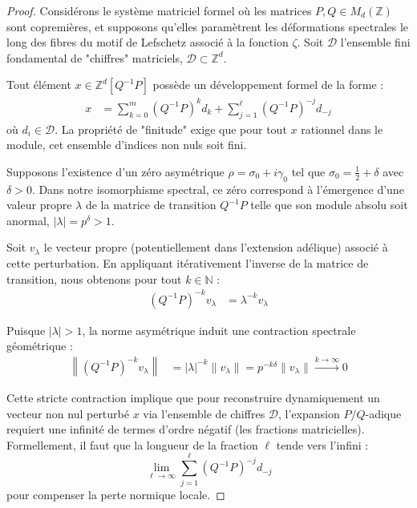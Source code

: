 \documentclass[
]{article}
\begin{document}
\begin{proof}
Considérons le système matriciel formel où les matrices $P, Q \in M_d(\mathbb{Z})$ sont copremières, et supposons qu'elles paramètrent les déformations spectrales le long des fibres du motif de Lefschetz associé à la fonction $\zeta$. Soit $\mathcal{D}$ l'ensemble fini fondamental de "chiffres" matriciels, $\mathcal{D} \subset \mathbb{Z}^d$.

Tout élément $x \in \mathbb{Z}^d[Q^{-1}P]$ possède un développement formel de la forme :
\begin{align*}
x &= \sum_{k=0}^{m} (Q^{-1}P)^k d_k + \sum_{j=1}^{\ell} (Q^{-1}P)^{-j} d_{-j}
\end{align*}
où $d_i \in \mathcal{D}$. La propriété de "finitude" exige que pour tout $x$ rationnel dans le module, cet ensemble d'indices non nuls soit fini.

Supposons l'existence d'un zéro asymétrique $\rho = \sigma_0 + i\gamma_0$ tel que $\sigma_0 = \frac{1}{2} + \delta$ avec $\delta > 0$. Dans notre isomorphisme spectral, ce zéro correspond à l'émergence d'une valeur propre $\lambda$ de la matrice de transition $Q^{-1}P$ telle que son module absolu soit anormal, $|\lambda| = p^{\delta} > 1$.

Soit $v_{\lambda}$ le vecteur propre (potentiellement dans l'extension adélique) associé à cette perturbation. En appliquant itérativement l'inverse de la matrice de transition, nous obtenons pour tout $k \in \mathbb{N}$ :
\begin{align*}
(Q^{-1}P)^{-k} v_{\lambda} &= \lambda^{-k} v_{\lambda}
\end{align*}

Puisque $|\lambda| > 1$, la norme asymétrique induit une contraction spectrale géométrique :
\begin{align*}
\left\| (Q^{-1}P)^{-k} v_{\lambda} \right\| &= |\lambda|^{-k} \|v_{\lambda}\| = p^{-k\delta} \|v_{\lambda}\| \xrightarrow{k \to \infty} 0
\end{align*}

Cette stricte contraction implique que pour reconstruire dynamiquement un vecteur non nul perturbé $x$ via l'ensemble de chiffres $\mathcal{D}$, l'expansion $P/Q$-adique requiert une infinité de termes d'ordre négatif (les fractions matricielles). Formellement, il faut que la longueur de la fraction $\ell$ tende vers l'infini :
\begin{equation*}
\lim_{\ell \to \infty} \sum_{j=1}^{\ell} (Q^{-1}P)^{-j} d_{-j}
\end{equation*}
pour compenser la perte normique locale.


\end{proof}
\end{document}
